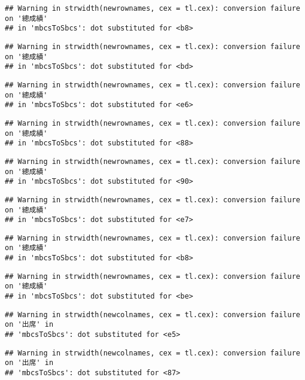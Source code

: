 \documentclass[
]{book}
\begin{document}
\begin{verbatim}
## Warning in strwidth(newrownames, cex = tl.cex): conversion failure on '總成績'
## in 'mbcsToSbcs': dot substituted for <b8>
\end{verbatim}

\begin{verbatim}
## Warning in strwidth(newrownames, cex = tl.cex): conversion failure on '總成績'
## in 'mbcsToSbcs': dot substituted for <bd>
\end{verbatim}

\begin{verbatim}
## Warning in strwidth(newrownames, cex = tl.cex): conversion failure on '總成績'
## in 'mbcsToSbcs': dot substituted for <e6>
\end{verbatim}

\begin{verbatim}
## Warning in strwidth(newrownames, cex = tl.cex): conversion failure on '總成績'
## in 'mbcsToSbcs': dot substituted for <88>
\end{verbatim}

\begin{verbatim}
## Warning in strwidth(newrownames, cex = tl.cex): conversion failure on '總成績'
## in 'mbcsToSbcs': dot substituted for <90>
\end{verbatim}

\begin{verbatim}
## Warning in strwidth(newrownames, cex = tl.cex): conversion failure on '總成績'
## in 'mbcsToSbcs': dot substituted for <e7>
\end{verbatim}

\begin{verbatim}
## Warning in strwidth(newrownames, cex = tl.cex): conversion failure on '總成績'
## in 'mbcsToSbcs': dot substituted for <b8>
\end{verbatim}

\begin{verbatim}
## Warning in strwidth(newrownames, cex = tl.cex): conversion failure on '總成績'
## in 'mbcsToSbcs': dot substituted for <be>
\end{verbatim}

\begin{verbatim}
## Warning in strwidth(newcolnames, cex = tl.cex): conversion failure on '出席' in
## 'mbcsToSbcs': dot substituted for <e5>
\end{verbatim}

\begin{verbatim}
## Warning in strwidth(newcolnames, cex = tl.cex): conversion failure on '出席' in
## 'mbcsToSbcs': dot substituted for <87>
\end{verbatim}
\end{document}
